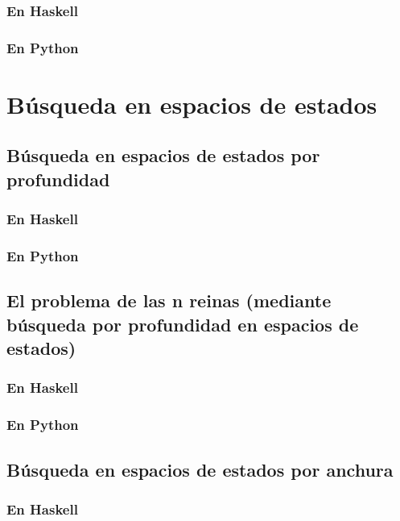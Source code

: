 \documentclass[a4paper,12pt,twoside]{book}
\begin{document}
\subsection{En Haskell}
\subsection{En Python}

\chapter{Búsqueda en espacios de estados}

\minitoc

\section{Búsqueda en espacios de estados por profundidad}
\subsection{En Haskell}
\subsection{En Python}

\section{El problema de las n reinas (mediante búsqueda por profundidad en espacios de estados)}
\subsection{En Haskell}
\subsection{En Python}

\section{Búsqueda en espacios de estados por anchura}
\subsection{En Haskell}
\end{document}
